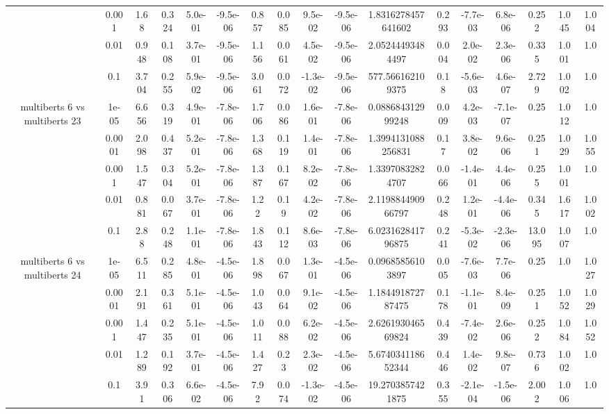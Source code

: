 \begin{tabular}{|c|c|c|c|c|c|c|c|c|c|c|c|c|c|c|c|c|}
 & 0.001 & 1.68 & 0.324 & 5.0e-01 & -9.5e-06 & 0.857 & 0.085 & 9.5e-02 & -9.5e-06 & 1.8316278457641602 & 0.293 & -7.7e-03 & 6.8e-06 & 0.252 & 1.045 & 1.004 \\
 & 0.01 & 0.948 & 0.108 & 3.7e-01 & -9.5e-06 & 1.156 & 0.061 & 4.5e-02 & -9.5e-06 & 2.05244493484497 & 0.004 & 2.0e-02 & 2.3e-06 & 0.335 & 1.001 & 1.0 \\
 & 0.1 & 3.704 & 0.255 & 5.9e-02 & -9.5e-06 & 3.061 & 0.072 & -1.3e-02 & -9.5e-06 & 577.566162109375 & 0.18 & -5.6e-03 & 4.6e-07 & 2.729 & 1.002 & 1.0 \\
\hline
\multirow{5}{*}{multiberts 6 vs multiberts 23} & 1e-05 & 6.656 & 0.319 & 4.9e-01 & -7.8e-06 & 1.706 & 0.086 & 1.6e-01 & -7.8e-06 & 0.088684312999248 & 0.009 & 4.2e-03 & -7.1e-07 & 0.25 & 1.012 & 1.0 \\
 & 0.0001 & 2.098 & 0.437 & 5.2e-01 & -7.8e-06 & 1.368 & 0.119 & 1.4e-01 & -7.8e-06 & 1.3994131088256831 & 0.17 & 3.8e-02 & 9.6e-06 & 0.251 & 1.029 & 1.055 \\
 & 0.001 & 1.547 & 0.304 & 5.2e-01 & -7.8e-06 & 1.387 & 0.167 & 8.2e-02 & -7.8e-06 & 1.33970832824707 & 0.066 & -1.4e-01 & 4.4e-06 & 0.255 & 1.001 & 1.0 \\
 & 0.01 & 0.881 & 0.067 & 3.7e-01 & -7.8e-06 & 1.22 & 0.19 & 4.2e-02 & -7.8e-06 & 2.119884490966797 & 0.248 & 1.2e-01 & -4.4e-06 & 0.345 & 1.617 & 1.002 \\
 & 0.1 & 2.88 & 0.248 & 1.1e-01 & -7.8e-06 & 1.843 & 0.112 & 8.6e-03 & -7.8e-06 & 6.023162841796875 & 0.241 & -5.3e-02 & -2.3e-06 & 13.095 & 1.007 & 1.0 \\
\hline
\multirow{5}{*}{multiberts 6 vs multiberts 24} & 1e-05 & 6.511 & 0.285 & 4.8e-01 & -4.5e-06 & 1.898 & 0.067 & 1.3e-01 & -4.5e-06 & 0.09685856103897 & 0.005 & -7.6e-03 & 7.7e-06 & 0.25 & 1.0 & 1.027 \\
 & 0.0001 & 2.191 & 0.361 & 5.1e-01 & -4.5e-06 & 1.043 & 0.064 & 9.1e-02 & -4.5e-06 & 1.184491872787475 & 0.178 & -1.1e-01 & 8.4e-09 & 0.251 & 1.052 & 1.029 \\
 & 0.001 & 1.447 & 0.235 & 5.1e-01 & -4.5e-06 & 1.011 & 0.088 & 6.2e-02 & -4.5e-06 & 2.626193046569824 & 0.439 & -7.4e-02 & 2.6e-06 & 0.252 & 1.084 & 1.052 \\
 & 0.01 & 1.289 & 0.192 & 3.7e-01 & -4.5e-06 & 1.427 & 0.23 & 2.3e-02 & -4.5e-06 & 5.674034118652344 & 0.446 & 1.4e-02 & 9.8e-07 & 0.736 & 1.002 & 1.0 \\
 & 0.1 & 3.91 & 0.306 & 6.6e-02 & -4.5e-06 & 7.92 & 0.074 & -1.3e-02 & -4.5e-06 & 19.2703857421875 & 0.355 & -2.1e-04 & -1.5e-06 & 2.002 & 1.006 & 1.0 \\

\end{tabular}
